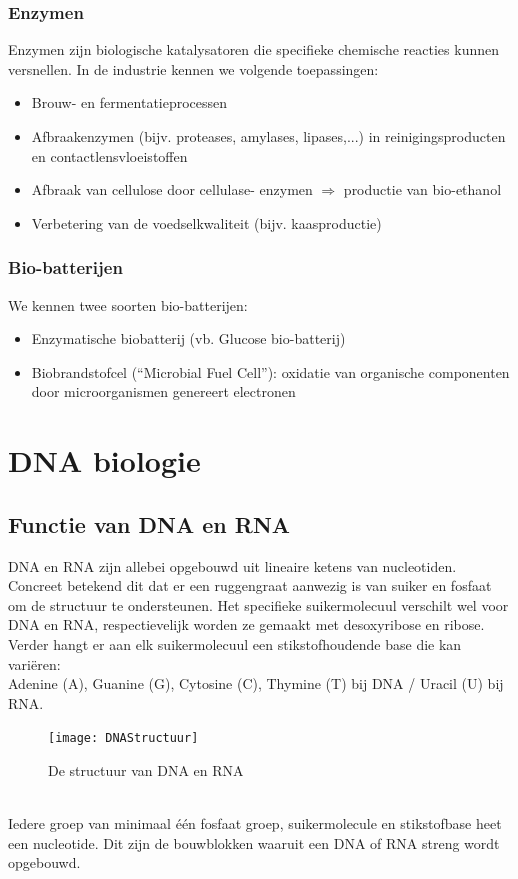 \documentclass[a4paper,kul]{kulakarticle} %
\begin{document}
\subsubsection{Enzymen}
Enzymen zijn biologische katalysatoren die specifieke chemische reacties kunnen versnellen. In de industrie kennen we volgende toepassingen:
\begin{itemize}
	\item Brouw- en fermentatieprocessen
	\item Afbraakenzymen (bijv. proteases, amylases,
	lipases,...) in reinigingsproducten en contactlensvloeistoffen
	\item Afbraak van cellulose door cellulase-
	enzymen $\Rightarrow$ productie van bio-ethanol
	\item Verbetering van de voedselkwaliteit (bijv.
	kaasproductie)
\end{itemize}
\subsubsection{Bio-batterijen}
We kennen twee soorten bio-batterijen:
\begin{itemize}
	\item Enzymatische biobatterij (vb. Glucose bio-batterij)
	\item Biobrandstofcel (“Microbial Fuel Cell”): oxidatie van organische
	componenten door microorganismen genereert electronen
\end{itemize}
\newpage
\section{DNA biologie}
\label{sec:dnabiologie}
\subsection{Functie van DNA en RNA}
DNA en RNA zijn allebei opgebouwd uit lineaire ketens van nucleotiden. Concreet betekend dit dat er een ruggengraat aanwezig is van suiker en fosfaat om de structuur te ondersteunen. Het specifieke suikermolecuul verschilt wel voor DNA en RNA, respectievelijk worden ze gemaakt met desoxyribose en ribose. Verder hangt er aan elk suikermolecuul een stikstofhoudende base die kan variëren: \\Adenine (A), Guanine (G), Cytosine (C), Thymine (T) bij DNA / Uracil (U) bij RNA.
\begin{figure}[h]
	\centering
	\texttt{[image: DNAStructuur]}
	\caption[DNA Structuur]{De structuur van DNA en RNA}
	\label{fig:dnastructuur}
\end{figure}\\
Iedere groep van minimaal één fosfaat groep, suikermolecule en stikstofbase heet een nucleotide. Dit zijn de bouwblokken waaruit een DNA of RNA streng wordt opgebouwd. 
\end{document}
